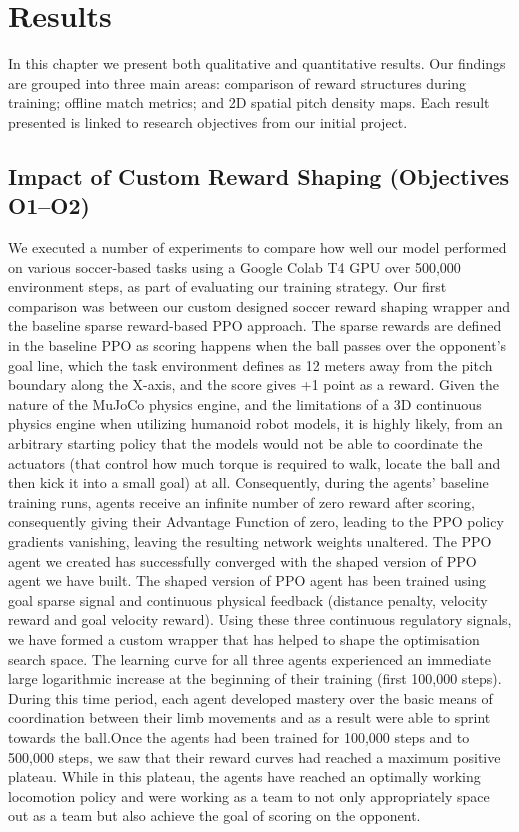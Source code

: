 \chapter{Results}
\label{ch:results}

In this chapter we present both qualitative and quantitative results. Our findings are grouped into three main areas: comparison of reward structures during training; offline match metrics; and 2D spatial pitch density maps. Each result presented is linked to research objectives from our initial project.

\section{Impact of Custom Reward Shaping (Objectives O1--O2)}
\label{sec:results_reward_shaping}

We executed a number of experiments to compare how well our model performed on various soccer-based tasks using a Google Colab T4 GPU over 500,000 environment steps, as part of evaluating our training strategy. Our first comparison was between our custom designed soccer reward shaping wrapper and the baseline sparse reward-based PPO approach. The sparse rewards are defined in the baseline PPO as scoring happens when the ball passes over the opponent's goal line, which the task environment defines as 12 meters away from the pitch boundary along the X-axis, and the score gives +1 point as a reward. Given the nature of the MuJoCo physics engine, and the limitations of a 3D continuous physics engine when utilizing humanoid robot models, it is highly likely, from an arbitrary starting policy that the models would not be able to coordinate the actuators (that control how much torque is required to walk, locate the ball and then kick it into a small goal) at all. Consequently, during the agents' baseline training runs, agents receive an infinite number of zero reward after scoring, consequently giving their Advantage Function of zero, leading to the PPO policy gradients vanishing, leaving the resulting network weights unaltered.
The PPO agent we created has successfully converged with the shaped version of PPO agent we have built. The shaped version of PPO agent has been trained using goal sparse signal and continuous physical feedback (distance penalty, velocity reward and goal velocity reward). Using these three continuous regulatory signals, we have formed a custom wrapper that has helped to shape the optimisation search space. The learning curve for all three agents experienced an immediate large logarithmic increase at the beginning of their training (first 100,000 steps). During this time period, each agent developed mastery over the basic means of coordination between their limb movements and as a result were able to sprint towards the ball.Once the agents had been trained for 100,000 steps and to 500,000 steps, we saw that their reward curves had reached a maximum positive plateau. While in this plateau, the agents have reached an optimally working locomotion policy and were working as a team to not only appropriately space out as a team but also achieve the goal of scoring on the opponent.

